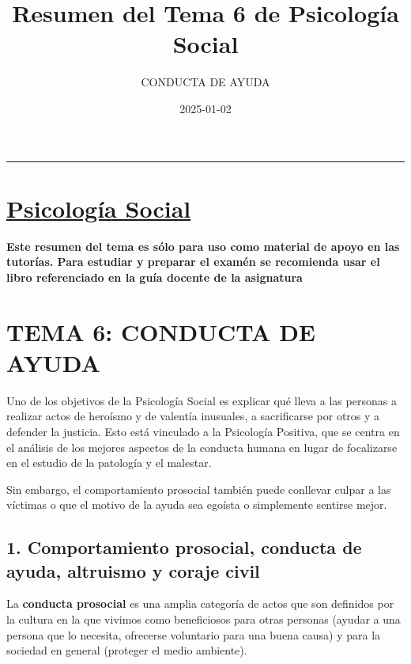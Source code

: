 \documentclass[
]{book}
\title{Resumen del Tema 6 de Psicología Social}
\subtitle{CONDUCTA DE AYUDA}
\author{}
\date{\vspace{-2.5em}2025-01-02}
\begin{document}
\maketitle

{
\setcounter{tocdepth}{1}
\tableofcontents
}
\begin{center}\rule{0.5\linewidth}{0.5pt}\end{center}

\chapter{\texorpdfstring{\href{https://dalarconrub.github.io/psicologia-social/}{Psicología Social}}{Psicología Social}}\label{psicologuxeda-social}

\textbf{Este resumen del tema es sólo para uso como material de apoyo en las tutorías. Para estudiar y preparar el examén se recomienda usar el libro referenciado en la guía docente de la asignatura}

\chapter{TEMA 6: CONDUCTA DE AYUDA}\label{tema-6-conducta-de-ayuda}

Uno de los objetivos de la Psicología Social es explicar qué lleva a las personas a realizar actos de heroísmo y de valentía inusuales, a sacrificarse por otros y a defender la justicia. Esto está vinculado a la Psicología Positiva, que se centra en el análisis de los mejores aspectos de la conducta humana en lugar de focalizarse en el estudio de la patología y el malestar.

Sin embargo, el comportamiento prosocial también puede conllevar culpar a las víctimas o que el motivo de la ayuda sea egoísta o simplemente sentirse mejor.

\section{1. Comportamiento prosocial, conducta de ayuda, altruismo y coraje civil}\label{comportamiento-prosocial-conducta-de-ayuda-altruismo-y-coraje-civil}

La \textbf{conducta prosocial} es una amplia categoría de actos que son definidos por la cultura en la que vivimos como beneficiosos para otras personas (ayudar a una persona que lo necesita, ofrecerse voluntario para una buena causa) y para la sociedad en general (proteger el medio ambiente).
\end{document}
